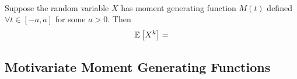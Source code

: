\begin{theorem}
    \phantom{}\\
    Suppose the random variable $X$ has moment generating function $M(t)$ defined $\forall t \in [-a,a]$ for some $a > 0$. Then \vspace{-3mm}
    \[
        \mathbb{E}\left[{X^k}\right] = 
    \]
\end{theorem}



\subsection{Motivariate Moment Generating Functions}









\newpage